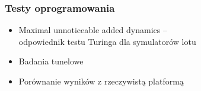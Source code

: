 \documentclass[aspectratio=169]{beamer}
\begin{document}
\begin{frame}
\begin{columns}
\begin{column}{0.33\textwidth}
\begin{figure}
            \end{figure}
            \begin{figure}
                \centering
            \end{figure}
            \begin{figure}
                \centering
            \end{figure}
        \end{column}
    \end{columns}
\end{frame}

\begin{frame}
	\frametitle{Testy oprogramowania} %
	\begin{itemize}
	\item<2-> Maximal unnoticeable added dynamics -- \\
		odpowiednik testu Turinga dla symulatorów lotu
	\item<3-> Badania tunelowe
	\item<4-> Porównanie wyników z rzeczywistą platformą
	\end{itemize}
\end{frame}
\end{document}
